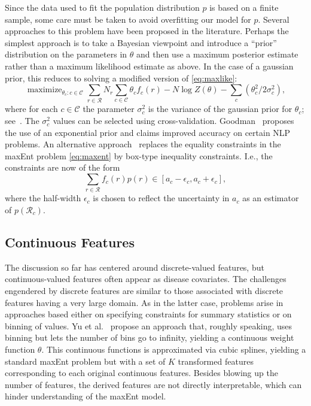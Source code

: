 \documentclass[11pt]{article}
\DeclareMathOperator*{\maximize}{maximize}
\newcommand{\xC}{\mathcal{C}}
\newcommand{\xR}{\mathcal{R}}
\let\eps\epsilon
\begin{document}
Since the data used to fit the population distribution $p$ is based on a finite sample, some care must be taken to avoid overfitting our model for $p$. Several approaches to this problem have been proposed in the literature. Perhaps the simplest approach is to take a Bayesian viewpoint and introduce a ``prior'' distribution on the parameters in $\theta$ and then use a maximum posterior estimate rather than a maximum likelihood estimate as above. In the case of a gaussian prior, this reduces to solving a modified version of \eqref{eq:maxlike}:
\begin{equation}\label{eq:maxlikegauss}
\maximize_{\theta_c:c\in\xC}\sum_{r\in\xR}N_r\sum_{c\in\xC}\theta_cf_c(r)-N\log Z(\theta) -\sum_c (\theta^2_c/ 2\sigma^2_c),
\end{equation}
where for each $c\in\xC$ the parameter $\sigma^2_c$ is the variance of the gaussian prior for $\theta_c$; see~\cite{ChenR00}. The $\sigma^2_c$ values can be selected using cross-validation. Goodman~\cite{Goodman04} proposes the use of an exponential prior and claims improved accuracy on certain NLP problems. An alternative approach~\cite{KazamaT05} replaces the equality constraints in the maxEnt problem \eqref{eq:maxent} by box-type inequality constraints. I.e., the constraints are now of the form
\[
\sum_{r\in\xR}f_c(r)p(r)\in[a_c-\eps_c,a_c+\eps_c],
\]
where the half-width $\eps_c$ is chosen to reflect the uncertainty in $a_c$ as an estimator of $p(\xR_c)$.

\subsection{Continuous Features}\label{sec:contf}

The discussion so far has centered around discrete-valued features, but continuous-valued features often appear as disease covariates. The challenges engendered by discrete features are similar to those associated with discrete features having a very large domain. As in the latter case, problems arise in approaches based either on specifying constraints for summary statistics or on binning of values. Yu et al.~\cite{YuDA09} propose an approach that, roughly speaking, uses binning but lets the number of bins go to infinity, yielding a continuous weight function $\theta$. This continuous functions is approximated via cubic splines, yielding a standard maxEnt problem but with a set of $K$ transformed features corresponding to each original continuous features. Besides blowing up the number of features, the derived features are not directly interpretable, which can hinder understanding of the maxEnt model.
\end{document}
